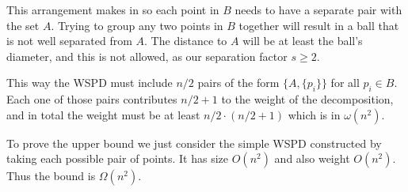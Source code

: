 \documentclass{article}
\begin{document}
  This arrangement makes in so each point in $B$ needs to have a separate pair with the set $A$.
  Trying to group any two points in $B$ together will result in a ball that is not well separated from $A$.
  The distance to $A$ will be at least the ball's diameter, and this is not allowed, as our separation factor $s \geq 2$.

  This way the WSPD must include $n/2$ pairs of the form $\{A, \{p_i\}\}$ for all $p_i \in B$.
  Each one of those pairs contributes $n/2+1$ to the weight of the decomposition,
  and in total the weight must be at least $n/2 \cdot (n/2+1)$ which is in $\omega(n^2)$.

  To prove the upper bound we just consider the simple WSPD constructed by taking each possible pair of points.
  It has size $O(n^2)$ and also weight $O(n^2)$.
  Thus the bound is $\Omega(n^2)$.
\end{document}
